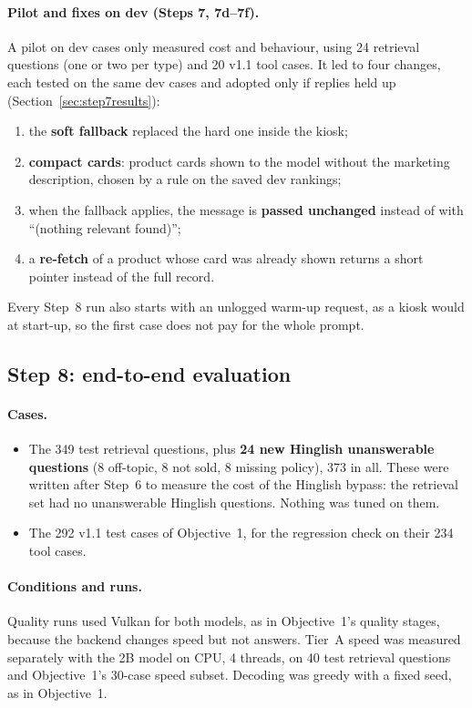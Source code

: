 \documentclass[11pt,a4paper]{article}
\begin{document}
\paragraph{Pilot and fixes on dev (Steps 7, 7d--7f).} A pilot on dev cases only measured cost and behaviour, using 24
retrieval questions (one or two per type) and 20 v1.1 tool cases. It led to four changes, each tested on the same dev
cases and adopted only if replies held up (Section~\ref{sec:step7results}):
\begin{enumerate}
  \item the \textbf{soft fallback} replaced the hard one inside the kiosk;
  \item \textbf{compact cards}: product cards shown to the model without the marketing description, chosen by a rule
        on the saved dev rankings;
  \item when the fallback applies, the message is \textbf{passed unchanged} instead of with ``(nothing relevant
        found)'';
  \item a \textbf{re-fetch} of a product whose card was already shown returns a short pointer instead of the full
        record.
\end{enumerate}
Every Step~8 run also starts with an unlogged warm-up request, as a kiosk would at start-up, so the first case does not
pay for the whole prompt.

\subsection{Step 8: end-to-end evaluation}\label{sec:step8method}
\paragraph{Cases.}
\begin{itemize}
  \item The 349 test retrieval questions, plus \textbf{24 new Hinglish unanswerable questions} (8 off-topic, 8 not sold,
        8 missing policy), 373 in all. These were written after Step~6 to measure the cost of the Hinglish bypass:
        the retrieval set had no unanswerable Hinglish questions. Nothing was tuned on them.
  \item The 292 v1.1 test cases of Objective~1, for the regression check on their 234 tool cases.
\end{itemize}

\paragraph{Conditions and runs.} Quality runs used Vulkan for both models, as in Objective~1's quality stages, because
the backend changes speed but not answers. Tier~A speed was measured separately with the 2B model on CPU, 4 threads, on
40 test retrieval questions and Objective~1's 30-case speed subset. Decoding was greedy with a fixed seed, as in
Objective~1.
\end{document}
